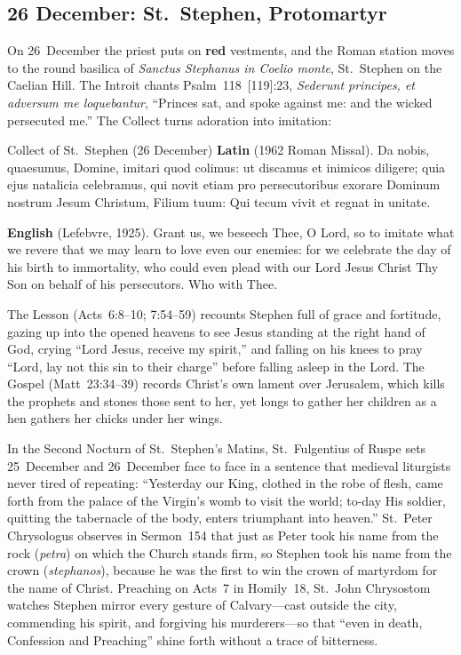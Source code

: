\subsection{26 December: St.~Stephen, Protomartyr}

On 26~December the priest puts on \textbf{red} vestments, and the Roman station
moves to the round basilica of \textit{Sanctus Stephanus in Coelio monte},
St.~Stephen on the Caelian Hill. The Introit chants Psalm~118~[119]:23,
\textit{Sederunt principes, et adversum me loquebantur}, ``Princes sat, and
spoke against me: and the wicked persecuted me.'' The Collect turns adoration
into imitation:

\begin{massbox}{Collect of St.~Stephen (26 December)}
\textbf{Latin} (1962 Roman Missal). Da nobis, quaesumus, Domine, imitari quod
colimus: ut discamus et inimicos diligere; quia ejus natalicia celebramus, qui
novit etiam pro persecutoribus exorare Dominum nostrum Jesum Christum, Filium
tuum: Qui tecum vivit et regnat in unitate.

\textbf{English} (Lefebvre, 1925). Grant us, we beseech Thee, O Lord, so to
imitate what we revere that we may learn to love even our enemies: for we
celebrate the day of his birth to immortality, who could even plead with our
Lord Jesus Christ Thy Son on behalf of his persecutors. Who with Thee.
\end{massbox}

The Lesson (Acts~6:8--10; 7:54--59) recounts Stephen full of grace and
fortitude, gazing up into the opened heavens to see Jesus standing at the right
hand of God, crying ``Lord Jesus, receive my spirit,'' and falling on his knees
to pray ``Lord, lay not this sin to their charge'' before falling asleep in the
Lord. The Gospel (Matt~23:34--39) records Christ's own lament over Jerusalem,
which kills the prophets and stones those sent to her, yet longs to gather her
children as a hen gathers her chicks under her wings.

In the Second Nocturn of St.~Stephen's Matins, St.~Fulgentius of Ruspe sets
25~December and 26~December face to face in a sentence that medieval liturgists
never tired of repeating: ``Yesterday our King, clothed in the robe of flesh,
came forth from the palace of the Virgin's womb to visit the world; to-day His
soldier, quitting the tabernacle of the body, enters triumphant into heaven.''
St.~Peter Chrysologus observes in Sermon~154 that just as Peter took his name
from the rock (\textit{petra}) on which the Church stands firm, so Stephen took
his name from the crown (\textit{stephanos}), because he was the first to win
the crown of martyrdom for the name of Christ. Preaching on Acts~7 in Homily~18,
St.~John Chrysostom watches Stephen mirror every gesture of Calvary---cast
outside the city, commending his spirit, and forgiving his murderers---so that
``even in death, Confession and Preaching'' shine forth without a trace of
bitterness.

